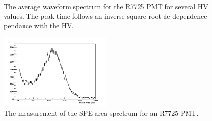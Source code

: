 \documentclass[12pt]{article}
\begin{document}
\begin{figure}[ht!]
    \centering
    ~
    \caption{\label{fig:speTemplate} The average waveform spectrum for the R7725 PMT for
    several HV values. The peak time follows an inverse square root de dependence pendance with the HV.}
\end{figure}

\begin{figure}[ht!]
    \centering
    \includegraphics[width=0.49\textwidth]{figures/speAreaSpectrum}
    \caption{\label{fig:speareaspectrum} The measurement of the SPE area spectrum for an R7725 PMT.}
\end{figure}

\clearpage



\end{document}
